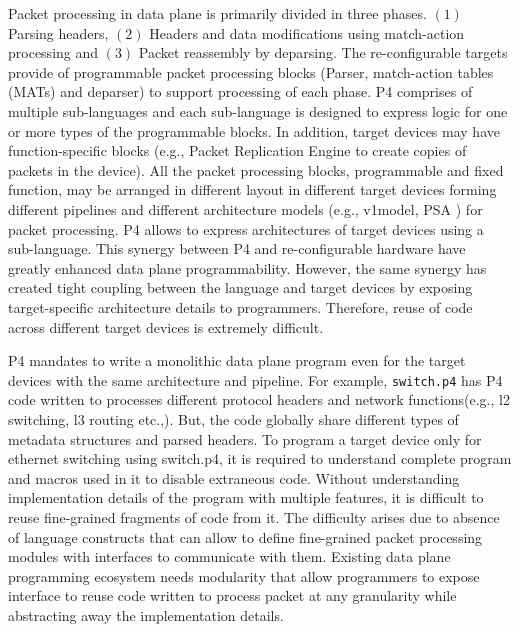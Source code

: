 \documentclass{hotnets19}
\begin{document}
Packet processing in data plane is primarily divided in three phases. $(1)$ Parsing headers, $(2)$ Headers and data modifications using match-action processing and $(3)$ Packet reassembly by deparsing.
The re-configurable targets provide of programmable packet processing blocks (Parser, match-action tables (MATs) and deparser) to support processing of each phase. 
P4 comprises of multiple sub-languages and each sub-language is designed to express logic for one or more types of the programmable blocks. 
In addition, target devices may have function-specific blocks (e.g., Packet Replication Engine to create copies of packets in the device).
All the packet processing blocks, programmable and fixed function, may be arranged in different layout in different target devices forming different pipelines and different architecture models (e.g., v1model\cite{v1model.p4}, PSA \cite{psa}) for packet processing.
P4 allows to express architectures of target devices using a sub-language.
This synergy between P4 and re-configurable hardware have greatly enhanced data plane programmability. 
However, the same synergy has created tight coupling between the language and target devices by exposing target-specific architecture details to programmers.
Therefore, reuse of code across different target devices is extremely difficult.


P4 mandates to write a monolithic data plane program even for the target devices with the same architecture and pipeline.
For example, \texttt{switch.p4} \cite{switch.p4} has P4 code written to processes different protocol headers and network functions(e.g., l2 switching, l3 routing etc.,). 
But, the code globally share different types of metadata structures and parsed headers.
To program a target device only for ethernet switching using switch.p4, it is required to understand complete program and macros used in it to disable extraneous code.
Without understanding implementation details of the program with multiple features, it is difficult to reuse fine-grained fragments of code from it.
The difficulty arises due to absence of language constructs that can allow to define fine-grained packet processing modules with interfaces to communicate with them.
Existing data plane programming ecosystem needs modularity that allow programmers to expose interface to reuse code written to process packet at any granularity while abstracting away the implementation details.
\end{document}
